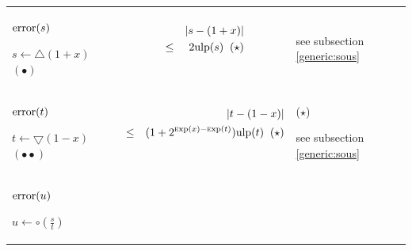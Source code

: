 \documentclass[12pt]{amsart}
\def\pinf{\bigtriangleup}
\def\minf{\bigtriangledown}
\def\ulp{{\rm ulp}}
\def\Exp{{\rm \textsc exp}}
\begin{document}
\begin{center}
\begin{tabular}{l l l}

\begin{minipage}{2.5cm}
${\textnormal{error}}(s)$


$s \leftarrow \pinf(1+x) $
$(\bullet)$
\end{minipage} &
\begin{minipage}{7.5cm}

\begin{eqnarray}\nonumber
  &&|s-(1+x)| \\\nonumber
  &       \leq&  2 \ulp(s)\;\;(\star)\\\nonumber
\end{eqnarray}


\end{minipage} &
\begin{minipage}{6cm}

see subsection \ref{generic:sous}


\end{minipage}\\%
\begin{minipage}{2.5cm}
${\textnormal{error}}(t)$

$t \leftarrow \minf(1-x) $
$(\bullet\bullet)$
\end{minipage} &
\begin{minipage}{7.5cm}



\begin{eqnarray}\nonumber
  &&|t-(1-x)| \\\nonumber
  &       \leq&  (1+2^{\Exp(x)-\Exp(t)}) \ulp(t) \;\;(\star)\\\nonumber
\end{eqnarray}


\end{minipage} &
\begin{minipage}{6cm}

($\star$)

see subsection \ref{generic:sous}


\end{minipage}\\%
\begin{minipage}{2.5cm}
${\textnormal{error}}(u)$


$u \leftarrow \circ(\frac{s}{t}) $


\end{minipage} &
\begin{minipage}{7.5cm}


\end{minipage}
\end{tabular}
\end{center}
\end{document}
